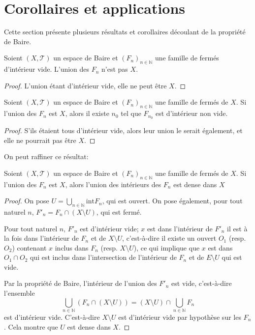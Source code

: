 \section{Corollaires et applications}
Cette section présente plusieurs résultats et corollaires
découlant de la propriété de Baire.

\begin{prop}
  Soient $(X, \mathcal{T})$ un espace de Baire et $(F_n)_{n\in\mathbb N}$
  une famille de fermés d'intérieur vide. L'union des $F_n$ n'est pas
  $X$.
\end{prop}
\begin{proof}
  L'union étant d'intérieur vide, elle ne peut être $X$.
\end{proof}

\begin{prop}\label{baire:cor:intf}
  Soient $(X, \mathcal{T})$ un espace de Baire et $(F_n)_{n\in\mathbb N}$
  une famille de fermés de $X$. Si l'union des $F_n$ est $X$,
  alors il existe $n_0$ tel que $F_{n_0}$ est d'intérieur non vide.
\end{prop}
\begin{proof}
  S'ils étaient tous d'intérieur vide, alors leur union le serait également,
  et elle ne pourrait pas être $X$.
\end{proof}

On peut raffiner ce résultat:
\begin{prop}
  Soient $(X, \mathcal{T})$ un espace de Baire et $(F_n)_{n\in\mathbb N}$
  une famille de fermés de $X$. Si l'union des $F_n$ est $X$,
  alors l'union des intérieurs des $F_n$ est dense dans $X$
\end{prop}

\begin{proof}
  On pose $U = \bigcup_{n\in\mathbb N} \mathrm{int}F_n$, qui est
  ouvert. On pose également, pour tout naturel $n$,
  $F'_n = F_n\cap (X\setminus U)$, qui est fermé.

  Pour tout naturel $n$, $F'_n$ est d'intérieur vide; $x$ est dans
  l'intérieur de $F'_n$ \ssi{} il est à la fois dans l'intérieur de
  $F_n$ et de $X\setminus U$, c'est-à-dire il existe un ouvert $O_1$
  (resp. $O_2$) contenant $x$ inclus dans $F_n$ (resp. $X\setminus U$),
  ce qui implique que $x$ est dans $O_1\cap O_2$ qui est inclus dans
  l'intersection de l'intérieur de $F_n$ et de $E\setminus U$ qui est vide.

  Par la propriété de Baire, l'intérieur de l'union des $F'_n$ est vide,
  c'est-à-dire l'ensemble
  $$\bigcup_{n\in\mathbb N} \left(F_n \cap (X\setminus U)\right) =
  (X\setminus U)\cap \bigcup_{n\in\mathbb N} F_n$$
  est d'intérieur vide. C'est-à-dire $X\setminus U$ est d'intérieur vide
  par hypothèse sur les $F_n$. Cela montre que
  $U$ est dense dans $X$.
\end{proof}

